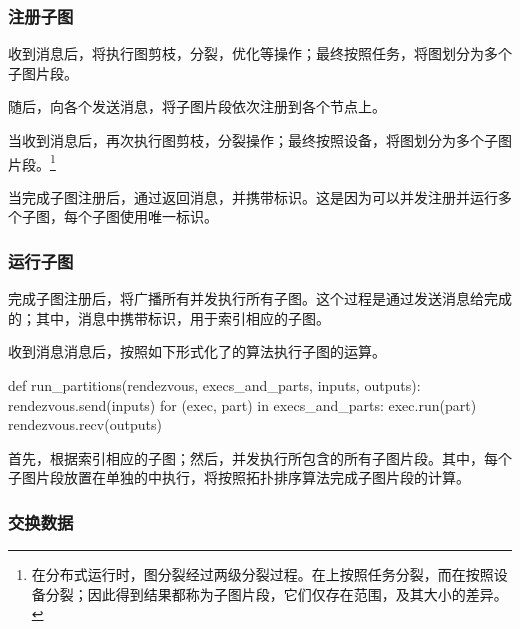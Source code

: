 \begin{content}
\subsubsection{注册子图}

收到消息后，将执行图剪枝，分裂，优化等操作；最终按照任务，将图划分为多个子图片段。

随后，向各个发送消息，将子图片段依次注册到各个节点上。

当收到消息后，再次执行图剪枝，分裂操作；最终按照设备，将图划分为多个子图片段。\footnote{在分布式运行时，图分裂经过两级分裂过程。在上按照任务分裂，而在按照设备分裂；因此得到结果都称为子图片段，它们仅存在范围，及其大小的差异。}

当完成子图注册后，通过返回消息，并携带标识。这是因为可以并发注册并运行多个子图，每个子图使用唯一标识。

\subsubsection{运行子图}

完成子图注册后，将广播所有并发执行所有子图。这个过程是通过发送消息给完成的；其中，消息中携带标识，用于索引相应的子图。

收到消息消息后，按照如下形式化了的算法执行子图的运算。

\begin{leftbar}
  \begin{python}
def run_partitions(rendezvous, execs_and_parts, inputs, outputs):
  rendezvous.send(inputs)
  for (exec, part) in execs_and_parts: 
    exec.run(part)
  rendezvous.recv(outputs)
  \end{python}
\end{leftbar}

首先，根据索引相应的子图；然后，并发执行所包含的所有子图片段。其中，每个子图片段放置在单独的中执行，将按照拓扑排序算法完成子图片段的计算。

\subsubsection{交换数据}


\end{content}
